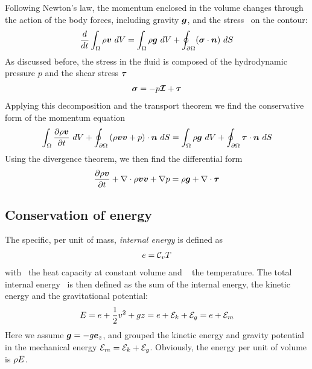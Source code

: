 Following Newton's law, the momentum enclosed in the volume changes
through the action of the body forces, including gravity $\boldsymbol {g}$, and
the stress \stressT~on the contour:
\begin{align*}
  \frac{d}{dt} \int_{\Omega} \rho \boldsymbol {v}~dV = \int_{\Omega} \rho \boldsymbol {g}~dV +
  \oint_{{\partial \Omega}} (\boldsymbol {\sigma} \cdot \boldsymbol {n})~dS
\end{align*}
As discussed before, the stress in the fluid is composed of the
hydrodynamic pressure $p$ and the shear stress $\boldsymbol {\tau}$
\begin{align*}
  \boldsymbol {\sigma} = - p \boldsymbol {\mathcal I} + \boldsymbol {\tau} 
\end{align*}
Applying this decomposition and the transport theorem we find the
conservative form of the momentum equation
\begin{equation}
  \int_{\Omega} \frac{\partial \rho \boldsymbol {v}}{\partial t}~dV + 
  \oint_{{\partial \Omega}} \left(\rho \boldsymbol {v} \boldsymbol {v} + p\right) \cdot \boldsymbol {n} ~dS = 
  \int_{\Omega} \rho \boldsymbol {g}~dV +
  \oint_{{\partial \Omega}} \boldsymbol {\tau} \cdot \boldsymbol {n}~dS
  \label{eq:momentumConservationIntegral}
\end{equation}
Using the divergence theorem, we then find the differential form 
\begin{equation}
  \frac{\partial \rho \boldsymbol {v}}{\partial t} + 
  \nabla \cdot \rho \boldsymbol {v} \boldsymbol {v} + \nabla p = \rho \boldsymbol {g} + \nabla \cdot \boldsymbol {\tau}  
  \label{eq:momentumConservationDifferential}
\end{equation}

\subsection{Conservation of energy}

The specific, \ie per unit of mass, \emph{internal energy} is defined
as
\begin{align*}
  e = \mathcal C_v T
\end{align*}
with \heatCapV~the heat capacity at constant volume and \temp~ the
temperature. The total internal energy \tEner~is then defined as the
sum of the internal energy, the kinetic energy and the gravitational
potential:
\begin{align*}
  E = e + \frac{1}{2} v^2 +
  g z = e + \mathcal E_k + \mathcal E_g = e + \mathcal E_m
\end{align*}
Here we assume $\boldsymbol {g} = - g \boldsymbol e_{z}$, and grouped the kinetic
energy and gravity potential in the mechanical energy $\mathcal E_m = \mathcal E_k
+ \mathcal E_g$. Obviously, the energy per unit of volume is $\rho E$.


